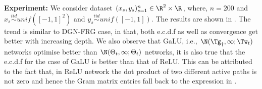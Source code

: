 \textbf{Experiment:} We consider dataset $(x_s,y_s)_{s=1}^{n}\in \R^2\times \R$, where, $n=200$ and $x_s\stackrel{iid}\sim unif(\left[-1,1\right]^2)$ and $y_s\stackrel{iid}\sim unif([-1,1])$. The results are shown in . The trend is similar to DGN-FRG case, in that, both e.c.d.f as well as convergence get better with increasing depth. We also observe that GaLU, i.e., $\N(\Tg_{\dagger},\infty;\Tw_t)$ networks optimise better than $\N(\Theta_t,\infty;\Theta_t)$ networks, it is also true that the e.c.d.f for the case of GaLU is better than that of ReLU. This can be attributed to the fact that, in ReLU network the dot product of two different active paths is not zero and hence the Gram matrix entries fall back to the expression in .
\FloatBarrier
\begin{figure}[h]
\end{figure}
